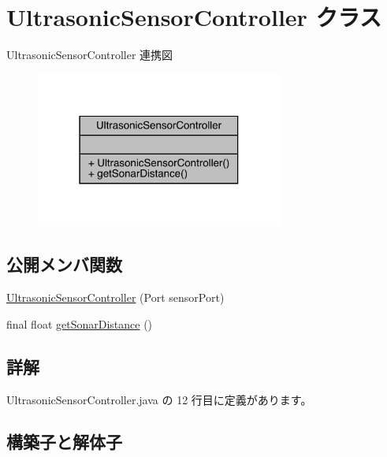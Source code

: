 \hypertarget{class_ultrasonic_sensor_controller}{}\section{Ultrasonic\+Sensor\+Controller クラス}
\label{class_ultrasonic_sensor_controller}


Ultrasonic\+Sensor\+Controller 連携図
\nopagebreak
\begin{figure}[H]
\begin{center}
\leavevmode
\includegraphics[width=231pt]{dd/da5/class_ultrasonic_sensor_controller__coll__graph}
\end{center}
\end{figure}
\subsection*{公開メンバ関数}
\begin{DoxyCompactItemize}
\item 
\mbox{\hyperlink{class_ultrasonic_sensor_controller_aedb42488e2bdd7beabd4c3902ac4b58f}{Ultrasonic\+Sensor\+Controller}} (Port sensor\+Port)
\item 
final float \mbox{\hyperlink{class_ultrasonic_sensor_controller_ac1e9488c4e078022f294a83cc1c7fd70}{get\+Sonar\+Distance}} ()
\end{DoxyCompactItemize}


\subsection{詳解}


 Ultrasonic\+Sensor\+Controller.\+java の 12 行目に定義があります。



\subsection{構築子と解体子}
\mbox{\label{class_ultrasonic_sensor_controller_aedb42488e2bdd7beabd4c3902ac4b58f}} 
